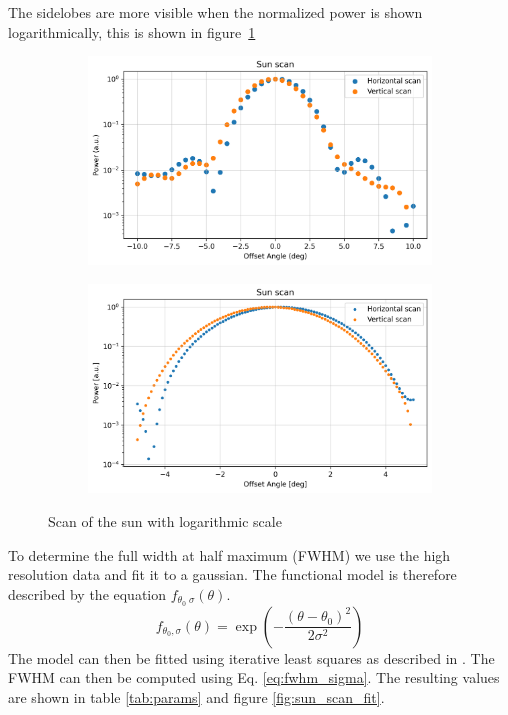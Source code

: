 The sidelobes are more visible when the normalized power is shown logarithmically, this is shown in figure~\ref{fig:sun_scan_log}
\begin{figure}[H]
    \centering
    \begin{subfigure}[t]{0.45\linewidth}
        \includegraphics[width=\linewidth]{assets/sun_scan_low_res_log.png}
    \end{subfigure}
    \begin{subfigure}[t]{0.45\linewidth}
        \includegraphics[width=\linewidth]{assets/sun_scan_high_res_log.png}
    \end{subfigure}
    \caption{Scan of the sun with logarithmic scale}
    \label{fig:sun_scan_log}
\end{figure}

To determine the full width at half maximum (FWHM) we use the high resolution data and fit it to a gaussian.
The functional model is therefore described by the equation $f_{\theta_0\;\sigma}(\theta)$.
\begin{equation}
    f_{\theta_0, \sigma}(\theta) = \exp{\left(-\frac{(\theta-\theta_0)^2}{2\sigma^2}\right)}
\end{equation}
The model can then be fitted using iterative least squares as described in \cite{ghilani_adjustment_2006}. The FWHM can then be computed using Eq. \eqref{eq:fwhm_sigma}.
The resulting values are shown in table \ref{tab:params} and figure \ref{fig:sun_scan_fit}.


